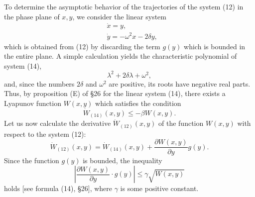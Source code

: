 \documentclass[10pt,a5paper]{book}
\theoremstyle{plain}
\theoremstyle{definition}
\theoremstyle{remark}
\begin{document}
To determine the asymptotic behavior of the trajectories of the system (12) in the phase plane of $x, y$, we consider the linear system
\begin{align*}
& \dot{x}=y, \\
& \dot{y}=-\omega^{2} x-2 \delta y, \tag{14}
\end{align*}
which is obtained from (12) by discarding the term $g(y)$ which is bounded in the entire plane. A simple calculation yields the characteristic polynomial of system (14),
\begin{equation*}
\lambda^{2}+2 \delta \lambda+\omega^{2}, \tag{15}
\end{equation*}
and, since the numbers $2 \delta$ and $\omega^{2}$ are positive, its roots have negative real parts. Thus, by proposition (E) of §26 for the linear system (14), there exists a Lyapunov function $W(x, y)$ which satisfies the condition
\begin{equation*}
\dot{W}_{(14)}(x, y) \leq-\beta W(x, y) . \tag{16}
\end{equation*}
Let us now calculate the derivative $\dot{W}_{(12)}(x, y)$ of the function $W(x, y)$ with respect to the system (12):
\begin{equation*}
\dot{W}_{(12)}(x, y)=\dot{W}_{(14)}(x, y)+\frac{\partial W(x, y)}{\partial y} g(y) . \tag{17}
\end{equation*}
Since the function $g(y)$ is bounded, the inequality
\begin{equation*}
\left|\frac{\partial W(x, y)}{\partial y} \cdot g(y)\right| \leq \gamma \sqrt{W(x, y)} \tag{18}
\end{equation*}
holds [see formula (14), §26], where $\gamma$ is some positive constant.
\end{document}

